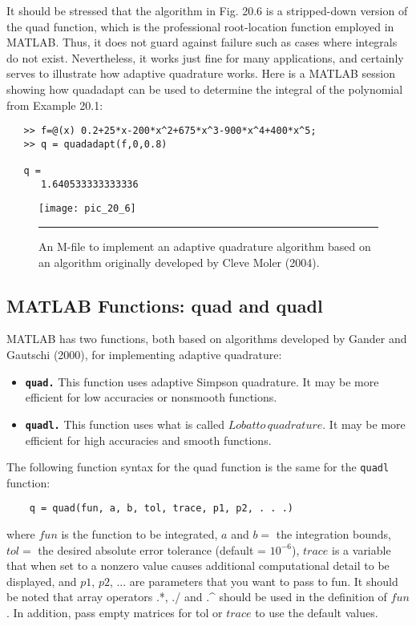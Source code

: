 \documentclass[../main.tex]{subfiles}
\begin{document}
It should be stressed that the algorithm in Fig. 20.6 is a stripped-down version of the quad
function, which is the professional root-location function employed in MATLAB. Thus, it
does not guard against failure such as cases where integrals do not exist. Nevertheless, it works
just fine for many applications, and certainly serves to illustrate how adaptive quadrature works. Here is a MATLAB session showing how quadadapt can be used to determine the integral of the polynomial from Example 20.1:

\begin{verbatim}
   >> f=@(x) 0.2+25*x-200*x^2+675*x^3-900*x^4+400*x^5;
   >> q = quadadapt(f,0,0.8)
   
   q =
      1.640533333333336
\end{verbatim}


\begin{figure}[hbt!]
	\centering
	\texttt{[image: pic\_20\_6]}
	\caption{\textsf{An M-file to implement an adaptive quadrature algorithm based on an algorithm originally
developed by Cleve Moler (2004).}} \hrule
	\label{pic.20.6}
\end{figure}


\subsection{MATLAB Functions: \small{quad} and \small{quadl}}
MATLAB has two functions, both based on algorithms developed by Gander and Gautschi
(2000), for implementing adaptive quadrature:

\begin{itemize}
	\item \texttt{\textbf{quad.}} This function uses adaptive Simpson quadrature. It may be more efficient for
low accuracies or nonsmooth functions.
	\item \texttt{\textbf{quadl.}} This function uses what is called $Lobatto\, quadrature$. It may be more efficient
for high accuracies and smooth functions.
\end{itemize}

The following function syntax for the quad function is the same for the  \texttt{quadl} 
function:

\begin{verbatim}
    q = quad(fun, a, b, tol, trace, p1, p2, . . .)
\end{verbatim}
where $fun$ is the function to be integrated, $a$ and $b =$ the integration bounds, $tol =$ the
desired absolute error tolerance (default = $10^{−6}$), $trace$ is a variable that when set to a
nonzero value causes additional computational detail to be displayed, and $p1$, $p2$, ...
are parameters that you want to pass to fun. It should be noted that array operators .*, ./
and .\^{} should be used in the definition of $fun$. In addition, pass empty matrices for tol or
$trace$ to use the default values.
\end{document}
